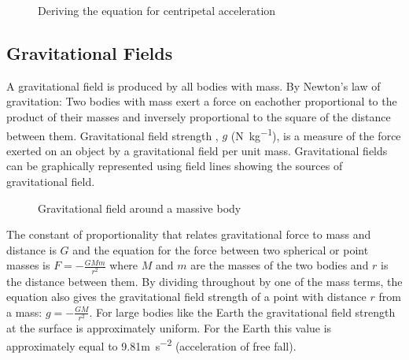 \documentclass[a4,8pt]{article}
\begin{document}
\begin{figure}[H]
\begin{center}
\caption{Deriving the equation for centripetal acceleration}
\end{center}
\end{figure}

\subsection{Gravitational Fields}
A gravitational field is produced by all bodies with mass. By Newton's law of gravitation: Two 
bodies with mass exert a force on eachother proportional to the product of their masses and 
inversely proportional to the square of the distance between them. Gravitational field strength
, $g$ (\si{\newton\per\kilo\gram}), is a measure of the force exerted on an object by a 
gravitational field per unit mass. Gravitational fields can be graphically represented using 
field lines showing the sources of gravitational field.

\begin{figure}[H]
\begin{center}
\caption{Gravitational field around a massive body}
\end{center}
\end{figure}

The constant of proportionality that relates gravitational force to mass and distance is $G$ 
and the equation for the force between two spherical or point masses is $F=-\frac{GMm}{r^2}$ 
where $M$ and $m$ are the masses of the two bodies and $r$ is the distance between them. By 
dividing throughout by one of the mass terms, the equation also gives the gravitational field 
strength of a point with distance $r$ from a mass: $g=-\frac{GM}{r^2}$. For large bodies like 
the Earth the gravitational field strength at the surface is approximately uniform. For the 
Earth this value is approximately equal to 9.81\si{\meter\per\square\second} (acceleration of 
free fall).
\end{document}
